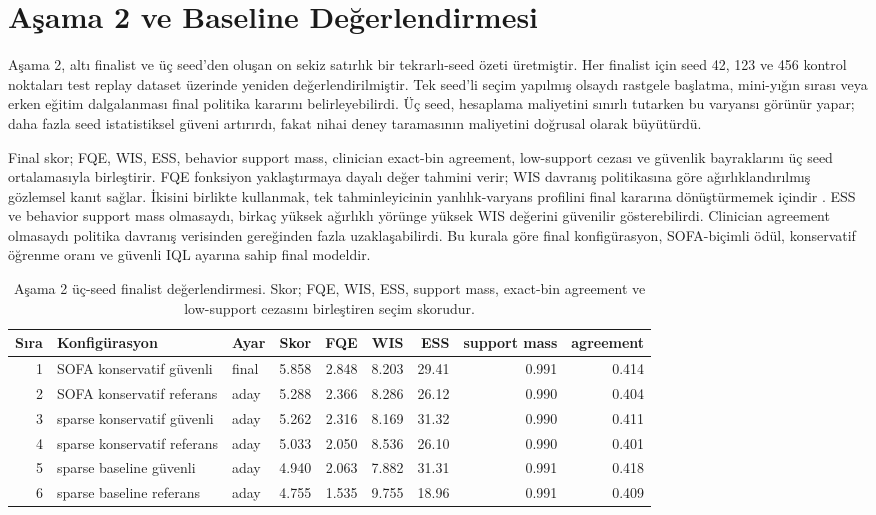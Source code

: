 \documentclass[conference]{IEEEtran}
\begin{document}
\section{Aşama 2 ve Baseline Değerlendirmesi}
Aşama 2, altı finalist ve üç seed'den oluşan on sekiz satırlık bir tekrarlı-seed özeti üretmiştir. Her finalist için seed 42, 123 ve 456 kontrol noktaları test replay dataset üzerinde yeniden değerlendirilmiştir. Tek seed'li seçim yapılmış olsaydı rastgele başlatma, mini-yığın sırası veya erken eğitim dalgalanması final politika kararını belirleyebilirdi. Üç seed, hesaplama maliyetini sınırlı tutarken bu varyansı görünür yapar; daha fazla seed istatistiksel güveni artırırdı, fakat nihai deney taramasının maliyetini doğrusal olarak büyütürdü.

Final skor; FQE, WIS, ESS, behavior support mass, clinician exact-bin agreement, low-support cezası ve güvenlik bayraklarını üç seed ortalamasıyla birleştirir. FQE fonksiyon yaklaştırmaya dayalı değer tahmini verir; WIS davranış politikasına göre ağırlıklandırılmış gözlemsel kanıt sağlar. İkisini birlikte kullanmak, tek tahminleyicinin yanlılık-varyans profilini final kararına dönüştürmemek içindir \cite{gottesman2019guidelines,voloshin2021ope,precup2000offpolicy}. ESS ve behavior support mass olmasaydı, birkaç yüksek ağırlıklı yörünge yüksek WIS değerini güvenilir gösterebilirdi. Clinician agreement olmasaydı politika davranış verisinden gereğinden fazla uzaklaşabilirdi. Bu kurala göre final konfigürasyon, SOFA-biçimli ödül, konservatif öğrenme oranı ve güvenli IQL ayarına sahip final modeldir.

\begin{table}[t]
\centering
\caption{Aşama 2 üç-seed finalist değerlendirmesi. Skor; FQE, WIS, ESS, support mass, exact-bin agreement ve low-support cezasını birleştiren seçim skorudur.}
\label{tab:stage2}
\begin{tabular}{rllrrrrrr}
\toprule
Sıra & Konfigürasyon & Ayar & Skor & FQE & WIS & ESS & support mass & agreement \\
\midrule
1 & SOFA konservatif güvenli & final & 5.858 & 2.848 & 8.203 & 29.41 & 0.991 & 0.414 \\
2 & SOFA konservatif referans & aday & 5.288 & 2.366 & 8.286 & 26.12 & 0.990 & 0.404 \\
3 & sparse konservatif güvenli & aday & 5.262 & 2.316 & 8.169 & 31.32 & 0.990 & 0.411 \\
4 & sparse konservatif referans & aday & 5.033 & 2.050 & 8.536 & 26.10 & 0.990 & 0.401 \\
5 & sparse baseline güvenli & aday & 4.940 & 2.063 & 7.882 & 31.31 & 0.991 & 0.418 \\
6 & sparse baseline referans & aday & 4.755 & 1.535 & 9.755 & 18.96 & 0.991 & 0.409 \\
\bottomrule
\end{tabular}
\end{table}
\end{document}
